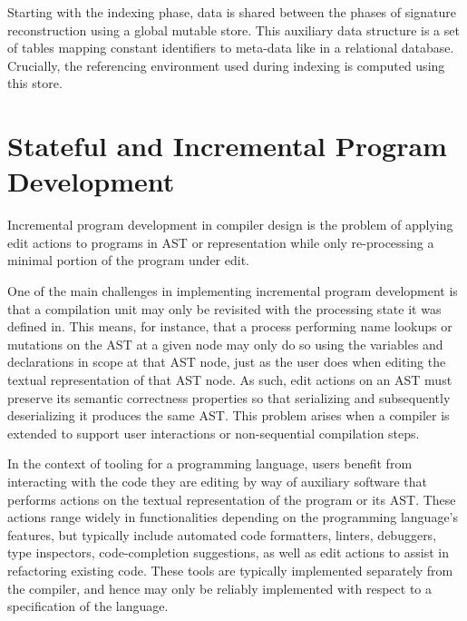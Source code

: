 Starting with the indexing phase, data is shared between the phases of signature reconstruction using a global mutable store.
This auxiliary data structure is a set of tables mapping constant identifiers to meta-data like in a relational database.
Crucially, the referencing environment used during indexing is computed using this store.



\section{Stateful and Incremental Program Development}

Incremental program development in compiler design is the problem of applying edit actions to programs in \ac{AST} or representation while only re-processing a minimal portion of the program under edit.

One of the main challenges in implementing incremental program development is that a compilation unit may only be revisited with the processing state it was defined in.
This means, for instance, that a process performing name lookups or mutations on the \ac{AST} at a given node may only do so using the variables and declarations in scope at that \ac{AST} node, just as the user does when editing the textual representation of that \ac{AST} node.
As such, edit actions on an \ac{AST} must preserve its semantic correctness properties so that serializing and subsequently deserializing it produces the same \ac{AST}.
This problem arises when a compiler is extended to support user interactions or non-sequential compilation steps.

In the context of tooling for a programming language, users benefit from interacting with the code they are editing by way of auxiliary software that performs actions on the textual representation of the program or its \ac{AST}.
These actions range widely in functionalities depending on the programming language's features, but typically include automated code formatters, linters, debuggers, type inspectors, code-completion suggestions, as well as edit actions to assist in refactoring existing code.
These tools are typically implemented separately from the compiler, and hence may only be reliably implemented with respect to a specification of the language.

